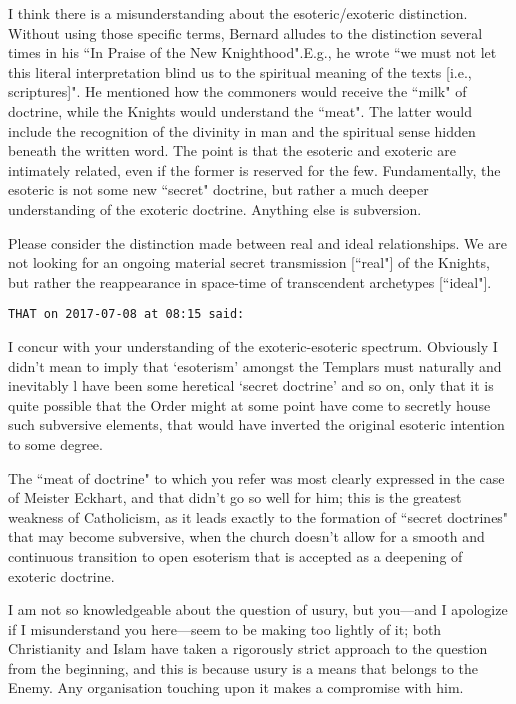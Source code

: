 \begin{footnotesize}
\begin{sffamily}
I think there is a misunderstanding about the esoteric/exoteric distinction. Without using those specific terms, Bernard alludes to the distinction several times in his ``In Praise of the New Knighthood".E.g., he wrote ``we must not let this literal interpretation blind us to the spiritual meaning of the texts [i.e., scriptures]". He mentioned how the commoners would receive the ``milk" of doctrine, while the Knights would understand the ``meat". The latter would include the recognition of the divinity in man and the spiritual sense hidden beneath the written word. The point is that the esoteric and exoteric are intimately related, even if the former is reserved for the few. Fundamentally, the esoteric is not some new ``secret" doctrine, but rather a much deeper understanding of the exoteric doctrine. Anything else is subversion.

Please consider the distinction made between real and ideal relationships. We are not looking for an ongoing material secret transmission [``real"] of the Knights, but rather the reappearance in space-time of transcendent archetypes [``ideal"].


\hfill

\texttt{THAT on 2017-07-08 at 08:15 said: }

I concur with your understanding of the exoteric-esoteric spectrum. Obviously I didn't mean to imply that `esoterism' amongst the Templars must naturally and inevitably l have been some heretical `secret doctrine' and so on, only that it is quite possible that the Order might at some point have come to secretly house such subversive elements, that would have inverted the original esoteric intention to some degree.

The ``meat of doctrine" to which you refer was most clearly expressed in the case of Meister Eckhart, and that didn't go so well for him; this is the greatest weakness of Catholicism, as it leads exactly to the formation of ``secret doctrines" that may become subversive, when the church doesn't allow for a smooth and continuous transition to open esoterism that is accepted as a deepening of exoteric doctrine.

I am not so knowledgeable about the question of usury, but you—and I apologize if I misunderstand you here—seem to be making too lightly of it; both Christianity and Islam have taken a rigorously strict approach to the question from the beginning, and this is because usury is a means that belongs to the Enemy. Any organisation touching upon it makes a compromise with him.


\end{sffamily}
\end{footnotesize}
